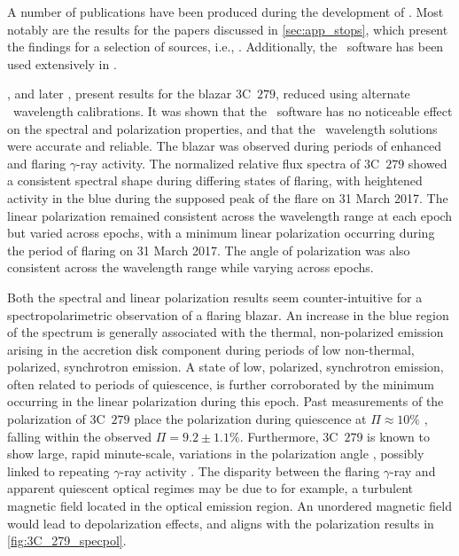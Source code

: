 A number of publications have been produced during the development of \stops.
Most notably are the results for the papers discussed in \autoref{sec:app_stops}, which present the findings for a selection of sources, i.e., \citet{Buckley191221B, Cooper_HEASA2021, Cooper_HEASA2022, Schutte4C0102}.
Additionally, the \stops\ software has been used extensively in \citet{Barnard_HEASA2021, Barnard_2024, Barnard_thesis}.


\citet{Cooper_HEASA2021}, and later \citet{Cooper_HEASA2022}, present results for the blazar $3$C~$279$, reduced using alternate \iraf\ wavelength calibrations.
It was shown that the \stops\ software has no noticeable effect on the spectral and polarization properties, and that the \iraf\ wavelength solutions were accurate and reliable.
The blazar was observed during periods of enhanced and flaring $\gamma$-ray activity.
The normalized relative flux spectra of $3$C~$279$ showed a consistent spectral shape during differing states of flaring, with heightened activity in the blue during the supposed peak of the flare on 31 March 2017.
The linear polarization remained consistent across the wavelength range at each epoch but varied across epochs, with a minimum linear polarization occurring during the period of flaring on 31 March 2017.
The angle of polarization was also consistent across the wavelength range while varying across epochs.

Both the spectral and linear polarization results seem counter-intuitive for a spectropolarimetric observation of a flaring blazar.
An increase in the blue region of the spectrum is generally associated with the thermal, non-polarized emission arising in the accretion disk component during periods of low non-thermal, polarized, synchrotron emission.
A state of low, polarized, synchrotron emission, often related to periods of quiescence, is further corroborated by the minimum occurring in the linear polarization during this epoch.
Past measurements of the polarization of 3C~$279$ place the polarization during quiescence at $\Pi \approx 10 \%$ \citep[see e.g., ][]{3C279_xray}, falling within the observed $\Pi = 9.2 \pm 1.1\%$.
Furthermore, 3C~$279$ is known to show large, rapid minute-scale, variations in the polarization angle \citep{3C279_var}, possibly linked to repeating $\gamma$-ray activity \citep{3C279_repeat}.
The disparity between the flaring $\gamma$-ray and apparent quiescent optical regimes may be due to for example, a turbulent magnetic field located in the optical emission region.
An unordered magnetic field would lead to depolarization effects, and aligns with the polarization results in \autoref{fig:3C_279_specpol}.

